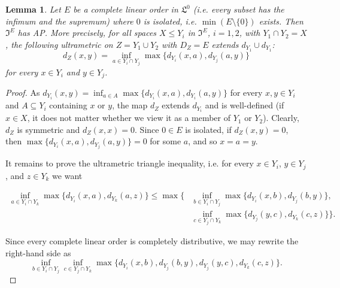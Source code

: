 \documentclass[10pt,a4paper]{article}
\newtheorem{lm}[tw]{Lemma}
\theoremstyle{definition}
\theoremstyle{remark}
\newcommand \set [1]{\{#1\}}
\newcommand \Lin {\mathfrak{L}}
\newcommand \UltIso {\mathfrak{I}}
\begin{document}
\begin{lm} \label{thm:complete_isometric_amalgamation}
    Let $E$ be a complete linear order in $\Lin^0$ (i.e. every subset has the infimum and the supremum) where $0$ is isolated, i.e. $\min(E \setminus \set{0})$ exists.
    Then $\UltIso^E$ has AP.
    More precisely, for all spaces $X \leq Y_i$ in $\UltIso^E$, $i = 1, 2$, with $Y_1 \cap Y_2 = X$, the following ultrametric on $Z = Y_1 \cup Y_2$ with $D_Z = E$ extends $d_{Y_1} \cup d_{Y_1}$:
    \[
        d_Z(x, y) = \inf_{a \in Y_i \cap Y_j} \max\set{d_{Y_i}(x, a), d_{Y_j}(a, y)}
    \]
    for every $x \in Y_i$ and $y \in Y_j$.
\end{lm}
\begin{proof}
    As $d_{Y_i}(x, y) = \inf_{a \in A} \max\set{d_{Y_i}(x, a), d_{Y_i}(a, y)}$ for every $x, y \in Y_i$ and $A \subseteq Y_i$ containing $x$ or $y$, the map $d_Z$ extends $d_{Y_i}$ and is well-defined (if $x \in X$, it does not matter whether we view it as a member of $Y_1$ or $Y_2$).
    Clearly, $d_Z$ is symmetric and $d_Z(x, x) = 0$.
    Since $0 \in E$ is isolated, if $d_Z(x, y) = 0$, then $\max\set{d_{Y_i}(x, a), d_{Y_j}(a, y)} = 0$ for some $a$, and so $x = a = y$.
    
    It remains to prove the ultrametric triangle inequality, i.e. for every $x \in Y_i$, $y \in Y_j$, and $z \in Y_k$ we want
 
    \begin{align*}
        \inf_{a \in Y_i \cap Y_k} \max\set{d_{Y_i}(x, a), d_{Y_k}(a, z)}
        \leq
        \max\bigl\{&\inf_{b \in Y_i \cap Y_j} \max\set{d_{Y_i}(x, b), d_{Y_j}(b, y)} 
        ,\\
        &\inf_{c \in Y_j \cap Y_k} \max\set{d_{Y_j}(y, c), d_{Y_k}(c, z)}\bigr\}.
    \end{align*}
    
    Since every complete linear order is completely distributive, we may rewrite the right-hand side as 
      \[
        \inf_{b \in Y_i \cap Y_j} \inf_{c \in Y_j \cap Y_k} \max\{d_{Y_i}(x, b) , d_{Y_j}(b, y) , d_{Y_j}(y, c) , d_{Y_k}(c, z)\}.
    \]
    

\end{proof}
\end{document}
